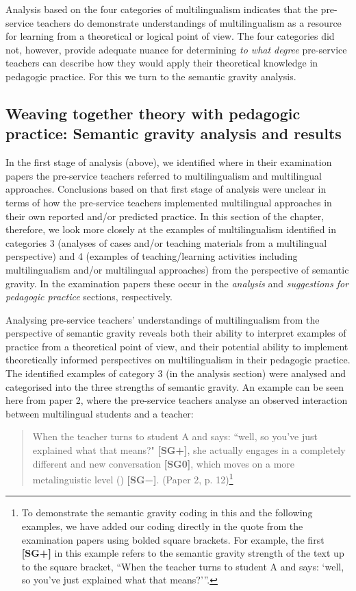 \documentclass[output=paper]{langscibook}
\begin{document}
Analysis based on the four categories of multilingualism indicates that the pre-service teachers do demonstrate understandings of multilingualism as a resource for learning from a theoretical or logical point of view. The four categories did not, however, provide adequate nuance for determining \textit{to what degree} pre-service teachers can describe how they would apply their theoretical knowledge in pedagogic practice. For this we turn to the semantic gravity analysis.

\subsection{Weaving together theory with pedagogic practice: Semantic gravity analysis and results}\label{sec:ostergaard:5.2}

In the first stage of analysis (above), we identified where in their examination papers the pre-service teachers referred to multilingualism and multilingual approaches. Conclusions based on that first stage of analysis were unclear in terms of how the pre-service teachers implemented multilingual approaches in their own reported and/or predicted practice. In this section of the chapter, therefore, we look more closely at the examples of multilingualism identified in categories 3 (analyses of cases and/or teaching materials from a multilingual perspective) and 4 (examples of teaching/learning activities including multilingualism and/or multilingual approaches) from the perspective of semantic gravity. In the examination papers these occur in the \textit{analysis} and \textit{suggestions for pedagogic practice} sections, respectively.

Analysing pre-service teachers’ understandings of multilingualism from the perspective of semantic gravity reveals both their ability to interpret examples of practice from a theoretical point of view, and their potential ability to implement theoretically informed perspectives on multilingualism in their pedagogic practice. The identified examples of category 3 (in the analysis section) were analysed and categorised into the three strengths of semantic gravity. An example can be seen here from paper 2, where the pre-service teachers analyse an observed interaction between multilingual students and a teacher:

\begin{quote}
When the teacher turns to student A and says: ``well, so you've just explained what that means?" \textbf{[SG+]}, she actually engages in a completely different and new conversation \textbf{[SG0]}, which moves on a more metalinguistic level (\citealt[28]{KnudsenWulff2021}) \textbf{[SG−]}. (Paper 2, p. 12)\footnote{To demonstrate the semantic gravity coding in this and the following examples, we have added our coding directly in the quote from the examination papers using bolded square brackets. For example, the first \textbf{[SG+]} in this example refers to the semantic gravity strength of the text up to the square bracket, “When the teacher turns to student A and says: ‘well, so you've just explained what that means?’”.}
\end{quote}
\end{document}
